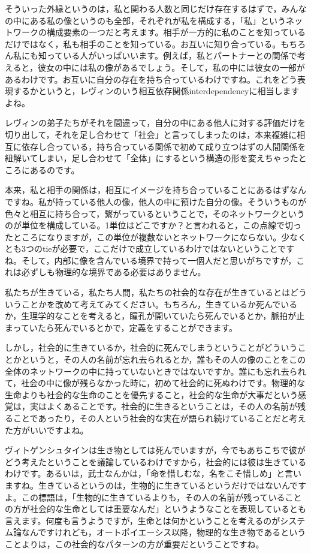 \documentclass{ltjsbook}
\begin{document}
そういった外縁というのは，私と関わる人数と同じだけ存在するはずで，みんなの中にある私の像というのも全部，それぞれが私を構成する，「私」というネットワークの構成要素の一つだと考えます。相手が一方的に私のことを知っているだけではなく，私も相手のことを知っている。お互いに知り合っている。もちろん私にも知っている人がいっぱいいます。例えば，私とパートナーとの関係で考えると，彼女の中には私の像があるでしょう。そして，私の中には彼女の一部があるわけです。お互いに自分の存在を持ち合っているわけですね。これをどう表現するかというと，レヴィンのいう相互依存関係interdependencyに相当しますよね。

レヴィンの弟子たちがそれを間違って，自分の中にある他人に対する評価だけを切り出して，それを足し合わせて「社会」と言ってしまったのは，本来複雑に相互に依存し合っている，持ち合っている関係で初めて成り立つはずの人間関係を紐解いてしまい，足し合わせて「全体」にするという構造の形を変えちゃったところにあるのです。

本来，私と相手の関係は，相互にイメージを持ち合っていることにあるはずなんですね。私が持っている他人の像，他人の中に預けた自分の像。そういうものが色々と相互に持ち合って，繋がっているということで，そのネットワークというのが単位を構成している。1単位はどこですか？と言われると，この点線で切ったところになりますが，この単位が複数ないとネットワークにならない。少なくとも3つのtieが必要で，ここだけで成立しているわけではないということですね。そして，内部に像を含んでいる境界で持って一個人だと思いがちですが，これは必ずしも物理的な境界である必要はありません。

私たちが生きている，私たち人間，私たちの社会的な存在が生きているとはどういうことかを改めて考えてみてください。もちろん，生きているか死んでいるか，生理学的なことを考えると，瞳孔が開いていたら死んでいるとか，脈拍が止まっていたら死んでいるとかで，定義をすることができます。

しかし，社会的に生きているか，社会的に死んでしまうということがどういうことかというと，その人の名前が忘れ去られるとか，誰もその人の像のことをこの全体のネットワークの中に持っていないときではないですか。誰にも忘れ去られて，社会の中に像が残らなかった時に，初めて社会的に死ぬわけです。物理的な生命よりも社会的な生命のことを優先すること，社会的な生命が大事だという感覚は，実はよくあることです。社会的に生きるということは，その人の名前が残ることであったり，その人という社会的な実在が語られ続けていることだと考えた方がいいですよね。

ヴィトゲンシュタインは生き物としては死んでいますが，今でもあちこちで彼がどう考えたということを議論しているわけですから，社会的には彼は生きているわけです。あるいは，武士なんかは，「命を惜しむな，名をこそ惜しめ」と言いますね。生きているというのは，生物的に生きているというだけではないんですよ。この標語は，「生物的に生きているよりも，その人の名前が残っていることの方が社会的な生命としては重要なんだ」というようなことを表現しているとも言えます。何度も言うようですが，生命とは何かということを考えるのがシステム論なんですけれども，オートポイエーシス以降，物理的な生き物であるということよりは，この社会的なパターンの方が重要だということですね。
\end{document}
